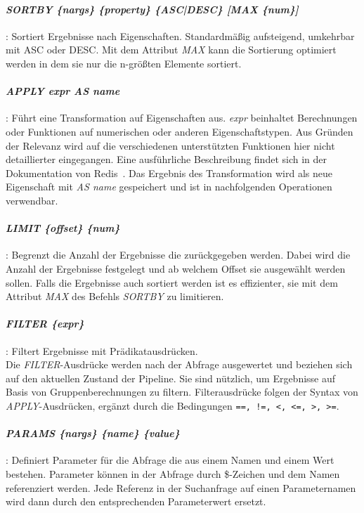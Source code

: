 \paragraph{\emph{SORTBY \{nargs\} \{property\} \{ASC|DESC\} [MAX \{num\}]}}: Sortiert Ergebnisse nach Eigenschaften. Standardmäßig aufsteigend, umkehrbar mit ASC oder DESC. Mit dem Attribut \emph{MAX} kann die Sortierung optimiert werden in dem sie nur die n-größten Elemente sortiert.

\paragraph{\emph{APPLY {expr} AS {name}}}: Führt eine Transformation auf Eigenschaften aus. \emph{expr} beinhaltet Berechnungen oder Funktionen auf numerischen oder anderen Eigenschaftstypen. Aus Gründen der Relevanz wird auf die verschiedenen unterstützten Funktionen hier nicht detaillierter eingegangen. Eine ausführliche Beschreibung findet sich in der Dokumentation von Redis~\cite{redis_ltd_aggregations_nodate}. Das Ergebnis des Transformation wird als neue Eigenschaft mit \emph{AS {name}} gespeichert und ist in nachfolgenden Operationen verwendbar.

\paragraph{\emph{LIMIT \{offset\} \{num\}}}: Begrenzt die Anzahl der Ergebnisse die zurückgegeben werden. Dabei wird die Anzahl der Ergebnisse festgelegt und ab welchem Offset sie ausgewählt werden sollen. Falls die Ergebnisse auch sortiert werden ist es effizienter, sie mit dem Attribut \emph{MAX} des Befehls \emph{SORTBY} zu limitieren.

\paragraph{\emph{FILTER \{expr\}}}: Filtert Ergebnisse mit Prädikatausdrücken.\\
Die \emph{FILTER}-Ausdrücke werden nach der Abfrage ausgewertet und beziehen sich auf den aktuellen Zustand der Pipeline. Sie sind nützlich, um Ergebnisse auf Basis von Gruppenberechnungen zu filtern. Filterausdrücke folgen der Syntax von \emph{APPLY}-Ausdrücken, ergänzt durch die Bedingungen \lstinline|==, !=, <, <=, >, >=|.

\paragraph{\emph{PARAMS \{nargs\} \{name\} \{value\}}}: Definiert Parameter für die Abfrage die aus einem Namen und einem Wert bestehen. Parameter können in der Abfrage durch \$-Zeichen und dem Namen referenziert werden. Jede Referenz in der Suchanfrage auf einen Parameternamen wird dann durch den entsprechenden Parameterwert ersetzt.

